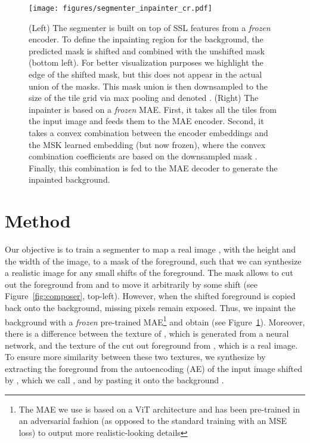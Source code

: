 \documentclass{article}
\begin{document}
\begin{figure}[t]
  \centering
\texttt{[image: figures/segmenter\_inpainter\_cr.pdf]}
\caption{(Left) The segmenter is built on top of SSL features from a \textit{frozen} encoder. To define the inpainting region for the background, the predicted mask is shifted and combined with the unshifted mask (bottom left). For better visualization purposes we highlight the edge of the shifted mask, but this does not appear in the actual union of the masks. This mask union is then downsampled to the size of the tile grid via max pooling and denoted .
(Right) The inpainter is based on a \textit{frozen} MAE. First, it takes all the tiles from the input image and feeds them to the MAE encoder. Second, it takes a convex combination between the encoder embeddings and the MSK learned embedding (but now frozen), where the convex combination coefficients are based on the downsampled mask . Finally, this combination is fed to the MAE decoder to generate the inpainted background.
}
\label{fig:segmenter}
\end{figure}



\section{Method}
\label{sec:method}

Our objective is to train a segmenter to map a real image , with  the height and  the width of the image, to a mask  of the foreground, such that we can synthesize a realistic image for any small shifts of the foreground. 
The mask allows to cut out the foreground from  and to move it arbitrarily by some  shift (see Figure~\ref{fig:composer}, top-left). 
However, when the shifted foreground is copied back onto the background, missing pixels remain exposed. Thus, we inpaint the background with a \textit{frozen} pre-trained MAE\footnote{The MAE \cite{he2021masked} we use is based on a ViT architecture and has been pre-trained in an adversarial fashion (as opposed to the standard training with an MSE loss) to output more realistic-looking details} and obtain  (see  Figure~\ref{fig:segmenter}). Moreover, there is a difference between the texture of , which is generated from a neural network, and the texture of the cut out foreground from , which is a real image. To ensure more similarity between these two textures, we synthesize  by extracting the foreground from the autoencoding (AE) of the input image  shifted by , which we call ,  and by pasting it onto the background .
\end{document}

